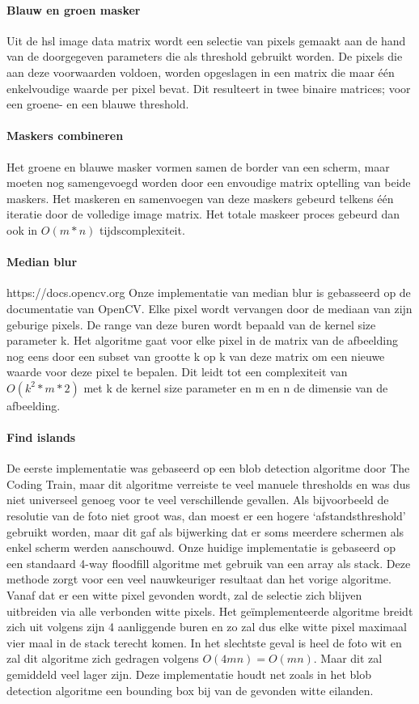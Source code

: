 \paragraph{Blauw en groen masker}
Uit de hsl image data matrix wordt een selectie van pixels gemaakt aan de hand van de doorgegeven parameters die als threshold gebruikt worden. De pixels die aan deze voorwaarden voldoen, worden opgeslagen in een matrix die maar één enkelvoudige waarde per pixel bevat. Dit resulteert in twee binaire matrices; voor een groene- en een blauwe threshold. 
\paragraph{Maskers combineren}
Het groene en blauwe masker vormen samen de border van een scherm, maar moeten nog samengevoegd worden door een envoudige matrix optelling van beide maskers.
Het maskeren en samenvoegen van deze maskers gebeurd telkens één iteratie door de volledige image matrix. Het totale maskeer proces gebeurd dan ook in $O(m*n)$ tijdscomplexiteit.

\paragraph{Median blur}
https://docs.opencv.org
Onze implementatie van median blur is gebasseerd op de documentatie van OpenCV. Elke pixel wordt vervangen door de mediaan van zijn geburige pixels. De range van deze buren wordt bepaald van de kernel size parameter k. Het algoritme gaat voor elke pixel in de matrix van de afbeelding nog eens door een subset van grootte k op k van deze matrix om een nieuwe waarde voor deze pixel te bepalen. Dit leidt tot een complexiteit van $O(k^2*m*2)$ met k de kernel size parameter en m en n de dimensie van de afbeelding.

\paragraph{Find islands}
De eerste implementatie was gebaseerd op een blob detection algoritme door The Coding Train, maar dit algoritme verreiste te veel manuele thresholds en was dus niet universeel genoeg voor te veel verschillende gevallen. Als bijvoorbeeld de resolutie van de foto niet groot was, dan moest er een hogere ‘afstandsthreshold’ gebruikt worden, maar dit gaf als bijwerking dat er soms meerdere schermen als enkel scherm werden aanschouwd.
Onze huidige implementatie is gebaseerd op een standaard 4-way floodfill algoritme met gebruik van een array als stack. Deze methode zorgt voor een veel nauwkeuriger resultaat dan het vorige algoritme. Vanaf dat er een witte pixel gevonden wordt, zal de selectie zich blijven uitbreiden via alle verbonden witte pixels. Het geïmplementeerde algoritme breidt zich uit volgens zijn 4 aanliggende buren en zo zal dus elke witte pixel maximaal vier maal in de stack terecht komen. In het slechtste geval is heel de foto wit en zal dit algoritme zich gedragen volgens $O(4mn)=O(mn)$. Maar dit zal gemiddeld veel lager zijn. Deze implementatie houdt net zoals in het blob detection algoritme een bounding box bij van de gevonden witte eilanden.

